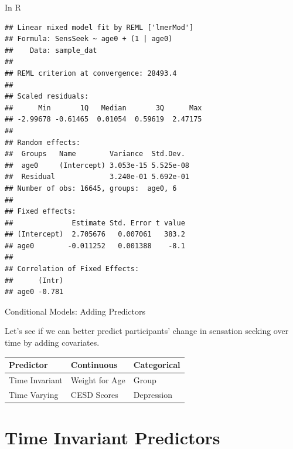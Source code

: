 \begin{frame}[fragile]{In R}

\small

\begin{Shaded}
\begin{Highlighting}[]
\StringTok{ }\OperatorTok{~}\StringTok{ }\OperatorTok{+}\StringTok{ }\NormalTok{(}\OperatorTok{|}
\end{Highlighting}
\end{Shaded}

\centering
\tiny

\begin{verbatim}
## Linear mixed model fit by REML ['lmerMod']
## Formula: SensSeek ~ age0 + (1 | age0)
##    Data: sample_dat
## 
## REML criterion at convergence: 28493.4
## 
## Scaled residuals: 
##      Min       1Q   Median       3Q      Max 
## -2.99678 -0.61465  0.01054  0.59619  2.47175 
## 
## Random effects:
##  Groups   Name        Variance  Std.Dev. 
##  age0     (Intercept) 3.053e-15 5.525e-08
##  Residual             3.240e-01 5.692e-01
## Number of obs: 16645, groups:  age0, 6
## 
## Fixed effects:
##              Estimate Std. Error t value
## (Intercept)  2.705676   0.007061   383.2
## age0        -0.011252   0.001388    -8.1
## 
## Correlation of Fixed Effects:
##      (Intr)
## age0 -0.781
\end{verbatim}

\normalsize
\raggedleft

\end{frame}

\begin{frame}{Conditional Models: Adding Predictors}

Let's see if we can better predict participants' change in sensation
seeking over time by adding covariates.

\begin{longtable}[]{@{}lll@{}}
\toprule
Predictor & Continuous & Categorical\tabularnewline
\midrule
\endhead
Time Invariant & Weight for Age & Group\tabularnewline
Time Varying & CESD Scores & Depression\tabularnewline
\bottomrule
\end{longtable}

\end{frame}

\section{Time Invariant Predictors}\label{time-invariant-predictors}

